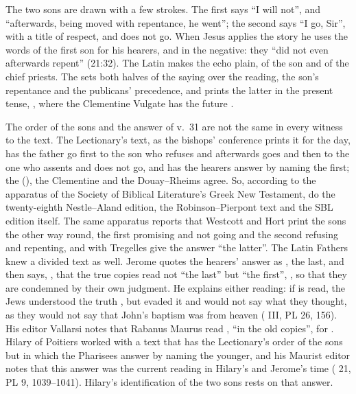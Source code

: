 The two sons are drawn with a few strokes. The first says ``I will not'', and
``afterwards, being moved with repentance, he went''; the second says ``I go,
Sir'', with a title of respect, and does not go. When Jesus applies the story
he uses the words of the first son for his hearers, and in the negative: they
``did not even afterwards repent'' (21:32). The Latin makes the echo plain,
 of the son and  of the chief priests. The  sets both
halves of the saying over the reading, the son's repentance and the publicans'
precedence, and prints the latter in the present tense, ,
where the Clementine Vulgate has the future .

The order of the sons and the answer of v.~31 are not the same in every
witness to the text. The Lectionary's text, as the bishops' conference prints
it for the day, has the father go first to the son who refuses and afterwards
goes and then to the one who assents and does not go, and has the hearers
answer by naming the first; the  (), the
Clementine and the Douay--Rheims agree. So, according to the apparatus of the
Society of Biblical Literature's Greek New Testament, do the twenty-eighth
Nestle--Aland edition, the Robinson--Pierpont text and the SBL edition itself.
The same apparatus reports that Westcott and Hort print the sons the other way
round, the first promising and not going and the second refusing and
repenting, and with Tregelles give the answer ``the latter''. The Latin Fathers
knew a divided text as well. Jerome quotes the hearers' answer as
, the last, and then says, , that the true copies read not
``the last'' but ``the first'', , so that
they are condemned by their own judgment. He explains either reading: if
 is read, the Jews understood the truth , but evaded it and would not say
what they thought, as they would not say that John's baptism was from heaven
( III, PL 26, 156). His editor Vallarsi notes
that Rabanus Maurus read , ``in the old copies'', for
. Hilary of Poitiers worked with a text that has the
Lectionary's order of the sons but in which the Pharisees answer by naming the
younger, and his Maurist editor notes that this answer was the current reading
in Hilary's and Jerome's time ( 21, PL 9,
1039--1041). Hilary's identification of the two sons rests on that answer.

